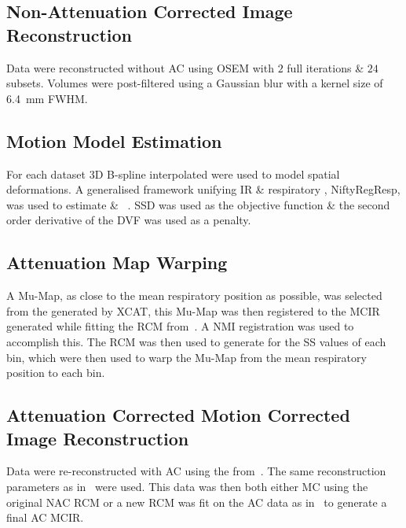     \subsection{Non-Attenuation Corrected Image Reconstruction} \label{sec:non-attenuation_corrected_image_reconstruction}
        Data were reconstructed without \gls{AC} using \gls{OSEM} with $2$ full iterations \& $24$ subsets.%
        Volumes were post-filtered using a Gaussian blur with a kernel size of \SI{6.4}{\milli\metre} \gls{FWHM}.
    
    \subsection{Motion Model Estimation} \label{sec:motion_model_estimation}
        For each dataset \gls{3D} B-spline interpolated  were used to model spatial deformations. A generalised framework unifying \gls{IR} \& respiratory , NiftyRegResp, was used to estimate  \& ~\cite{McClelland2017}. \gls{SSD} was used as the objective function \& the second order derivative of the \gls{DVF} was used as a penalty.%
    
    \subsection{Attenuation Map Warping} \label{sec:attenuation_map_warping}
        A \gls{Mu-Map}, as close to the mean respiratory position as possible, was selected from the  generated by \gls{XCAT}, this \gls{Mu-Map} was then registered to the \gls{MCIR} generated while fitting the \gls{RCM} from~. A \gls{NMI} registration was used to accomplish this.%
        The \gls{RCM} was then used to generate  for the \gls{SS} values of each bin, which were then used to warp the \gls{Mu-Map} from the mean respiratory position to each bin.
        
    \subsection{Attenuation Corrected Motion Corrected Image Reconstruction} \label{sec:attenuation_corrected_image_reconstruction}
        Data were re-reconstructed with \gls{AC} using the  from~. The same reconstruction parameters as in~ were used. This data was then both either \gls{MC} using the original \gls{NAC} \gls{RCM} or a new \gls{RCM} was fit on the \gls{AC} data as in~ to generate a final \gls{AC} \gls{MCIR}.
    
